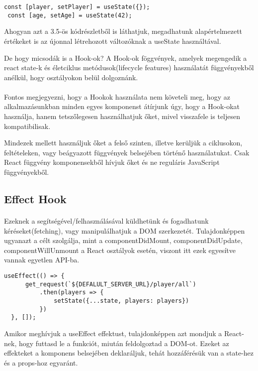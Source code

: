 \begin{lstlisting}[caption= useState hook-nak a használata]
 const [player, setPlayer] = useState({});
 const [age, setAge] = useState(42);
\end{lstlisting}

Ahogyan azt a 3.5-ös kódrészletből is láthatjuk, megadhatunk alapértelmezett értékeket is az újonnal létrehozott változóknak a useState használtával.

De hogy micsodák is a Hook-ok? A Hook-ok föggvények, amelyek megengedik a react state-k és életciklus metódusok(lifecycle features) használatát függvényekből anélkül, hogy osztályokon belül dolgoznánk. 

\paragraph{}
Fontos megjegyezni, hogy a Hookok használata nem követeli meg, hogy az alkalmazásunkban minden egyes komponenst átírjunk úgy, hogy a Hook-okat  használja, hanem tetszőlegesen használhatjuk őket, mivel visszafele is teljesen kompatibilisak.

Mindezek mellett használjuk őket a felső szinten, illetve kerüljük a ciklusokon, feltételeken, vagy beágyazott függvények belsejében történő használatukat. Csak React függvény komponensekből hívjuk őket és ne reguláris JavaScript függvényekből.

\subsection{Effect Hook}
\paragraph{}
Ezeknek a segítségével/felhasználásával küldhetünk és fogadhatunk kéréseket(fetching), vagy manipulálhatjuk a DOM szerkezetét. Tulajdonképpen ugyanazt a célt szolgálja, mint a componentDidMount, componentDidUpdate, componentWillUnmount  a React osztályok esetén, viszont itt ezek egyesítve vannak egyetlen API-ba.

\begin{lstlisting}[caption= useEffect hook-nak a használata]
  useEffect(() => {
      get_request(`${DEFALULT_SERVER_URL}/player/all`)
          .then(players => {
              setState({...state, players: players})
          })
  }, []);
\end{lstlisting}
  
Amikor meghívjuk a useEffect effektust, tulajdonképpen azt mondjuk a React-nek, hogy futtasd le a funkciót, miután feldolgoztad a DOM-ot. Ezeket az effekteket a komponens belsejében deklaráljuk, tehát hozzáférésük van a state-hez és a props-hoz egyaránt. 
 
